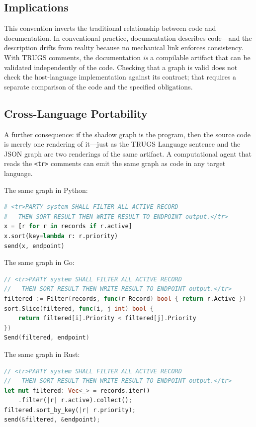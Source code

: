 \documentclass{article}
\begin{document}
\subsection{Implications}

This convention inverts the traditional relationship between code and documentation. In conventional practice, documentation describes code---and the description drifts from reality because no mechanical link enforces consistency. With TRUGS comments, the documentation \textit{is} a compilable artifact that can be validated independently of the code. Checking that a graph is valid does not check the host-language implementation against its contract; that requires a separate comparison of the code and the specified obligations.

\subsection{Cross-Language Portability}

A further consequence: if the shadow graph is the program, then the source code is merely one rendering of it---just as the TRUGS Language sentence and the JSON graph are two renderings of the same artifact. A computational agent that reads the \texttt{<tr>} comments can emit the same graph as code in any target language.

The same graph in Python:

\begin{lstlisting}[language=Python]
# <tr>PARTY system SHALL FILTER ALL ACTIVE RECORD
#   THEN SORT RESULT THEN WRITE RESULT TO ENDPOINT output.</tr>
x = [r for r in records if r.active]
x.sort(key=lambda r: r.priority)
send(x, endpoint)
\end{lstlisting}

The same graph in Go:

\begin{lstlisting}[language=Go]
// <tr>PARTY system SHALL FILTER ALL ACTIVE RECORD
//   THEN SORT RESULT THEN WRITE RESULT TO ENDPOINT output.</tr>
filtered := Filter(records, func(r Record) bool { return r.Active })
sort.Slice(filtered, func(i, j int) bool {
    return filtered[i].Priority < filtered[j].Priority
})
Send(filtered, endpoint)
\end{lstlisting}

The same graph in Rust:

\begin{lstlisting}[language=Rust]
// <tr>PARTY system SHALL FILTER ALL ACTIVE RECORD
//   THEN SORT RESULT THEN WRITE RESULT TO ENDPOINT output.</tr>
let mut filtered: Vec<_> = records.iter()
    .filter(|r| r.active).collect();
filtered.sort_by_key(|r| r.priority);
send(&filtered, &endpoint);
\end{lstlisting}
\end{document}

